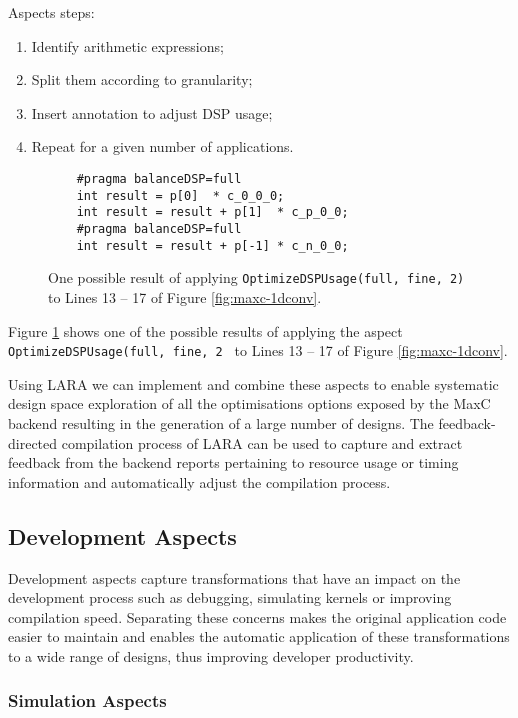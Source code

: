 Aspects steps:

\begin{enumerate}
\item Identify arithmetic expressions;
\item Split them according to granularity;
\item Insert annotation to adjust DSP usage;
\item Repeat for a given number of applications.
\end{enumerate}

\begin{figure}
  \begin{lstlisting}
    #pragma balanceDSP=full
    int result = p[0]  * c_0_0_0;
    int result = result + p[1]  * c_p_0_0;
    #pragma balanceDSP=full
    int result = result + p[-1] * c_n_0_0;
  \end{lstlisting}
  \caption{One possible result of applying
    \texttt{OptimizeDSPUsage(full, fine, 2)} to Lines 13 -- 17 of Figure
    \ref{fig:maxc-1dconv}.}
  \label{fig:maxc-1dconv-aspect}
\end{figure}

Figure \ref{fig:maxc-1dconv-aspect} shows one of the possible results
of applying the aspect \texttt{OptimizeDSPUsage(full, fine, 2 } to
Lines 13 -- 17 of Figure \ref{fig:maxc-1dconv}.

Using LARA we can implement and combine these aspects to enable
systematic design space exploration of all the optimisations options
exposed by the MaxC backend resulting in the generation of a large
number of designs. The feedback-directed compilation process of LARA can
be used to capture and extract feedback from the backend reports
pertaining to resource usage or timing information and automatically
adjust the compilation process.

\subsection{Development Aspects}

Development aspects capture transformations that have an impact on the
development process such as debugging, simulating kernels or improving
compilation speed. Separating these concerns makes the original
application code easier to maintain and enables the automatic
application of these transformations to a wide range of designs, thus
improving developer productivity.

\subsubsection{Simulation Aspects}

